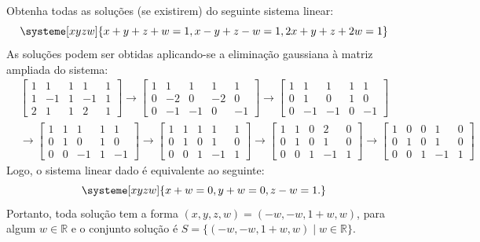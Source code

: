 \documentclass[12pt,a4paper]{article}
\newcommand*\R{\mathbb{R}}
\begin{document}
\begin{ExerciseList}
\Exercise[title={2,0}] Obtenha todas as soluções (se existirem) do seguinte sistema linear:
\[
\systeme[xyzw]{
 x + y + z + w = 1,
 x - y + z - w  = 1,
2x + y + z +2w = 1
}
\]
\Answer As soluções podem ser obtidas aplicando-se a eliminação gaussiana à matriz ampliada do sistema:
\begin{align*}
& \begin{bmatrix}
1 &  1 & 1 &  1 & 1\\
1 & -1 & 1 & -1 & 1\\
2 &  1 & 1 &  2 & 1
\end{bmatrix}
\rightarrow
\begin{bmatrix}
1 &  1 & 1 &  1 & 1\\
0 & -2 & 0 & -2 & 0\\
0 & -1 & -1 & 0 & -1
\end{bmatrix}
\rightarrow
\begin{bmatrix}
1 &  1 & 1 &  1 & 1\\
0 & 1 & 0 & 1 & 0\\
0 & -1 & -1 & 0 & -1
\end{bmatrix} \\
& \rightarrow
\begin{bmatrix}
1 &  1 & 1 &  1 & 1\\
0 & 1 & 0 & 1 & 0\\
0 & 0 & -1 & 1 & -1
\end{bmatrix}
\rightarrow
\begin{bmatrix}
1 &  1 & 1 &  1 & 1\\
0 & 1 & 0 & 1 & 0\\
0 & 0 & 1 & -1 & 1
\end{bmatrix}
\rightarrow
\begin{bmatrix}
1 &  1 & 0 &  2 & 0\\
0 & 1 & 0 & 1 & 0\\
0 & 0 & 1 & -1 & 1
\end{bmatrix}
\rightarrow
\begin{bmatrix}
1 & 0 & 0 & 1 & 0\\
0 & 1 & 0 & 1 & 0\\
0 & 0 & 1 & -1 & 1
\end{bmatrix}
\end{align*}
Logo, o sistema linear dado é equivalente ao seguinte:
\[
\systeme[xyzw]{
x+w=0,
y+w=0,
z-w=1.
}
\]
Portanto, toda solução tem a forma $(x,y,z,w) = (-w,-w,1+w,w)$, para algum $w \in \R$ e o conjunto solução é $S = \{(-w,-w,1+w,w)\mid w \in \R\}$.


\end{ExerciseList}
\end{document}
